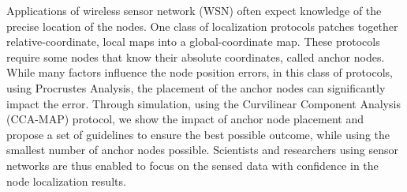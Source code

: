 Applications of wireless sensor network (WSN) often expect knowledge of the precise location of the nodes. One class of localization protocols patches together relative-coordinate, local maps into a global-coordinate map.  These protocols require some nodes that know their absolute coordinates, called anchor nodes.  While many factors influence the node position errors, in this class of protocols, using Procrustes Analysis, the placement of the anchor nodes can significantly impact the error.  Through simulation, using the Curvilinear Component Analysis (CCA-MAP) protocol, we show the impact of anchor node placement and propose a set of guidelines to ensure the best possible outcome, while using the smallest number of anchor nodes possible.  Scientists and researchers using sensor networks are thus enabled to focus on the sensed data with confidence in the node localization results.
